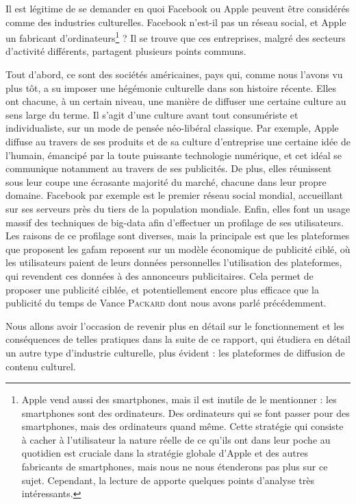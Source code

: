 \documentclass[a4paper,12pt]{report}
\begin{document}
Il est légitime de se demander en quoi Facebook ou Apple peuvent être considérés comme des industries culturelles. Facebook n'est-il pas un réseau social, et Apple un fabricant d'ordinateurs\footnote{Apple vend aussi des smartphones, mais il est inutile de le mentionner : les smartphones sont des ordinateurs. Des ordinateurs qui se font passer pour des smartphones, mais des ordinateurs quand même. Cette stratégie qui consiste à cacher à l'utilisateur la nature réelle de ce qu'ils ont dans leur poche au quotidien est cruciale dans la stratégie globale d'Apple et des autres fabricants de smartphones, mais nous ne nous étenderons pas plus sur ce sujet. Cependant, la lecture de \cite{kids_computer} apporte quelques points d'analyse très intéressants.} ? Il se trouve que ces entreprises, malgré des secteurs d'activité différents, partagent plusieurs points communs.

Tout d'abord, ce sont des sociétés américaines, pays qui, comme nous l'avons vu plus tôt, a su imposer une hégémonie culturelle dans son histoire récente. Elles ont chacune, à un certain niveau, une manière de diffuser une certaine culture au sens large du terme. Il s'agit d'une culture avant tout consumériste et individualiste, sur un mode de pensée néo-libéral classique. Par exemple, Apple diffuse au travers de ses produits et de sa culture d'entreprise une certaine idée de l'humain, émancipé par la toute puissante technologie numérique, et cet idéal se communique notamment au travers de ses publicités. De plus, elles réunissent sous leur coupe une écrasante majorité du marché, chacune dans leur propre domaine. Facebook par exemple est le premier réseau social mondial, accueillant sur ses serveurs près du tiers de la population mondiale. Enfin, elles font un usage massif des techniques de \gls{big-data} afin d'effectuer un profilage de ses utilisateurs. Les raisons de ce profilage sont diverses, mais la principale est que les plateformes que proposent les \gls{gafam} reposent sur un modèle économique de publicité ciblé, où les utilisateurs paient de leurs données personnelles l'utilisation des plateformes, qui revendent ces données à des annonceurs publicitaires. Cela permet de proposer une publicité ciblée, et potentiellement encore plus efficace que la publicité du temps de Vance \textsc{Packard} dont nous avons parlé précédemment.

Nous allons avoir l'occasion de revenir plus en détail sur le fonctionnement et les conséquences de telles pratiques dans la suite de ce rapport, qui étudiera en détail un autre type d'industrie culturelle, plus évident : les plateformes de diffusion de contenu culturel.
\end{document}
